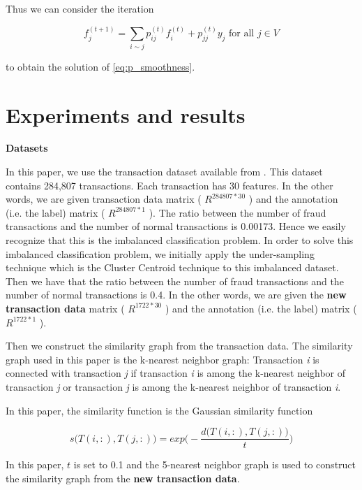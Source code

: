 Thus we can consider the iteration 

$$f_{j}^{ \left( t+1 \right) }= \sum _{i \sim j}^{}p_{ij}^{ \left( t \right) }f_{i}^{ \left( t \right) }+p_{jj}^{ \left( t \right) }y_{j} \text{ for all } j \in V $$

to obtain the solution of \ref{eq:p_smoothness}.


\section{Experiments and results}

\textbf{Datasets}

In this paper, we use the transaction dataset available from \citep{dal2015calibrating}. This dataset contains 284,807 transactions. Each transaction has 30 features. In the other words, we are given transaction data matrix ( \( R^{284807\ast30} \) ) and the annotation (i.e. the label) matrix ( \( R^{284807\ast1} \) ). The ratio between the number of fraud transactions and the number of normal transactions is 0.00173. Hence we easily recognize that this is the imbalanced classification problem. In order to solve this imbalanced classification problem, we initially apply the under-sampling technique which is the Cluster Centroid technique \citep{yen2009cluster} to this imbalanced dataset. Then we have that the ratio between the number of fraud transactions and the number of normal transactions is 0.4. In the other words, we are given the \textbf{new transaction data} matrix ( \( R^{1722\ast30} \) ) and the annotation (i.e. the label) matrix ( \( R^{1722\ast1} \) ).\par

Then we construct the similarity graph from the transaction data. The similarity graph used in this paper is the k-nearest neighbor graph: Transaction \textit{i} is connected with transaction \textit{j} if transaction \textit{i} is among the k-nearest neighbor of transaction \textit{j} or transaction \textit{j} is among the k-nearest neighbor of transaction \textit{i}.\  \textit{ } \par

In this paper, the similarity function is the Gaussian similarity function

$$
s \big( T(i,:), T(j,:) \big) = exp \bigg( - \frac{ d \big(T(i,:), T(j,:) \big) }{t} \bigg)
$$

In this paper, $t$ is set to 0.1 and the 5-nearest neighbor graph is used to construct the similarity graph from the \textbf{new transaction data}.\ \ \ \ \  \par

